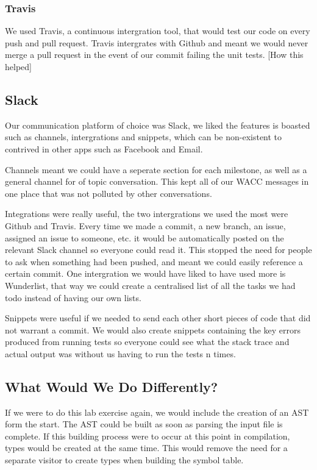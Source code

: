 \documentclass[11pt,a4paper]{article}
\begin{document}
\subsubsection{Travis}
\label{subs:Travis}
We used Travis, a continuous intergration tool, that would test our code on every push and pull request. Travis intergrates with Github and meant we would never merge a pull request in the event of our commit failing the unit tests. [How this helped]

\subsection{Slack}
\label{sub:Slack}
Our communication platform of choice was Slack, we liked the features is boasted such as channels, intergrations and snippets, which can be non-existent to contrived in other apps such as Facebook and Email.

Channels meant we could have a seperate section for each milestone, as well as a general channel for of topic conversation. This kept all of our WACC messages in one place that was not polluted by other conversations.

Integrations were really useful, the two intergrations we used the most were Github and Travis. Every time we made a commit, a new branch, an issue, assigned an issue to someone, etc. it would be automatically posted on the relevant Slack channel so everyone could read it. This stopped the need for people to ask when something had been pushed, and meant we could easily reference a certain commit. One intergration we would have liked to have used more is Wunderlist, that way we could create a centralised list of all the tasks we had todo instead of having our own lists.

Snippets were useful if we needed to send each other short pieces of code that did not warrant a commit. We would also create snippets containing the key errors produced from running tests so everyone could see what the stack trace and actual output was without us having to run the tests n times.

\subsection{What Would We Do Differently?}
\label{sub:What Would We Do Differently?}

If we were to do this lab exercise again, we would include the creation of an AST form the start. The AST could be built as soon as parsing the input file is complete. If this building process were to occur at this point in compilation, types would be created at the same time. This would remove the need for a separate visitor to create types when building the symbol table.
\end{document}
